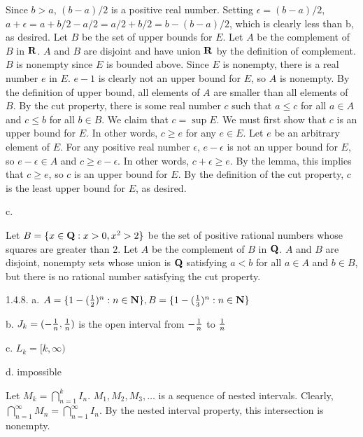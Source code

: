 Since $b > a$, $(b - a) / 2$ is a positive real number.
Setting $\epsilon = (b - a) / 2$,
$a + \epsilon = a + b/2 - a/2 = a/2 + b/2 = b - (b - a)/2$,
which is clearly less than b, as desired.
\medskip
Let $B$ be the set of upper bounds for $E$.
Let $A$ be the complement of $B$ in $\real$.
$A$ and $B$ are disjoint and have union $\real$
by the definition of complement.
$B$ is nonempty since $E$ is bounded above.
Since $E$ is nonempty, there is a real number $e$ in $E$.
$e - 1$ is clearly not an upper bound for $E$, so $A$ is nonempty.
By the definition of upper bound,
all elements of $A$ are smaller than all elements of $B$.
By the cut property, there is some real number $c$ such that
$a \le c$ for all $a \in A$ and $c \le b$ for all $b \in B$.
We claim that $c = \sup E$.
We must first show that $c$ is an upper bound for $E$.
In other words, $c \ge e$ for any $e \in E$.
Let $e$ be an arbitrary element of $E$.
For any positive real number $\epsilon$,
$e - \epsilon$ is not an upper bound for $E$,
so $e - \epsilon \in A$ and $c \ge e - \epsilon$.
In other words, $c + \epsilon \ge e$.
By the lemma, this implies that $c \ge e$,
so $c$ is an upper bound for $E$.
By the definition of the cut property,
$c$ is the least upper bound for $E$, as desired.
\medskip
\item{} c.

Let $B = \{x \in \rational : x > 0, x^2 > 2\}$
be the set of positive rational numbers whose squares are greater than $2$.
Let $A$ be the complement of $B$ in $\rational$.
$A$ and $B$ are disjoint, nonempty sets whose union is $\rational$
satisfying $a < b$ for all $a \in A$ and $b \in B$,
but there is no rational number satisfying the cut property.
\bigskip
\item{1.4.8.} a.
$A = \{1 - ({1 \over 2})^n : n \in \natural\},
B = \{1 - ({1 \over 3})^n : n \in \natural\}$
\medskip
\item{} b.
$J_k = (-{1 \over n}, {1 \over n})$
is the open interval from $-{1 \over n}$ to $1 \over n$
\medskip
\item{} c.
$L_k = [k, \infty)$
\medskip
\item{} d.
impossible

Let $M_k = \bigcap_{n=1}^k I_n$.
$M_1, M_2, M_3, \ldots$ is a sequence of nested intervals.
Clearly, $\bigcap_{n=1}^\infty M_n = \bigcap_{n=1}^\infty I_n$.
By the nested interval property, this intersection is nonempty.
\bye
